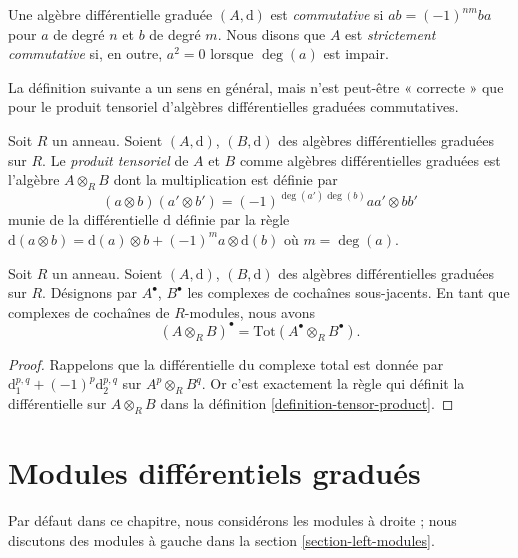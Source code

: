 \begin{definition}
\label{definition-cdga}
Une algèbre différentielle graduée $(A, \text{d})$ est {\it commutative} si
$ab = (-1)^{nm}ba$ pour $a$ de degré $n$ et $b$ de degré $m$.
Nous disons que $A$ est {\it strictement commutative} si, en outre, $a^2 = 0$
lorsque $\deg(a)$ est impair.
\end{definition}

\noindent
La définition suivante a un sens en général, mais n'est peut-être
« correcte » que pour le produit tensoriel d'algèbres différentielles graduées
commutatives.

\begin{definition}
\label{definition-tensor-product}
Soit $R$ un anneau.
Soient $(A, \text{d})$, $(B, \text{d})$ des algèbres différentielles graduées sur $R$.
Le {\it produit tensoriel} de $A$ et $B$ comme algèbres différentielles graduées
est l'algèbre $A \otimes_R B$ dont la multiplication est définie par
$$
(a \otimes b)(a' \otimes b') = (-1)^{\deg(a')\deg(b)} aa' \otimes bb'
$$
munie de la différentielle $\text{d}$ définie par la règle
$\text{d}(a \otimes b) = \text{d}(a) \otimes b + (-1)^m a \otimes \text{d}(b)$
où $m = \deg(a)$.
\end{definition}

\begin{lemma}
\label{lemma-total-complex-tensor-product}
Soit $R$ un anneau.
Soient $(A, \text{d})$, $(B, \text{d})$ des algèbres différentielles graduées sur $R$.
Désignons par $A^\bullet$, $B^\bullet$ les complexes de cochaînes sous-jacents.
En tant que complexes de cochaînes de $R$-modules, nous avons
$$
(A \otimes_R B)^\bullet = \text{Tot}(A^\bullet \otimes_R B^\bullet).
$$
\end{lemma}

\begin{proof}
Rappelons que la différentielle du complexe total est donnée par
$\text{d}_1^{p, q} + (-1)^p \text{d}_2^{p, q}$ sur $A^p \otimes_R B^q$.
Or c'est exactement la règle qui définit la différentielle
sur $A \otimes_R B$ dans la
définition \ref{definition-tensor-product}.
\end{proof}






\section{Modules différentiels gradués}
\label{section-modules}

\noindent
Par défaut dans ce chapitre, nous considérons les modules à
droite ; nous discutons des modules à gauche dans la section \ref{section-left-modules}.

